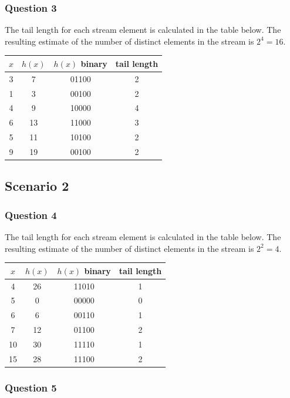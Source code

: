 \documentclass[12t]{article}
\begin{document}
	\subsubsection*{Question 3}
	
	The tail length for each stream element is calculated in the table below. The resulting estimate of the number of distinct elements in the stream is $2^{4}=16$.\\

	\begin{tabular}{cccc}
	$x$ & $h(x)$ & $h(x)$ binary & tail length \\
	\hline
	3 & 7 & 01100 & 2 \\
	1 & 3 & 00100 & 2 \\
	4 & 9 & 10000 & 4 \\
	6 & 13 & 11000 & 3 \\
	5 & 11 & 10100 & 2 \\
	9 & 19 & 00100 & 2 \\
	\hline
	\end{tabular}
	
	\subsection*{Scenario 2}	
	
	\subsubsection*{Question 4}
	
	The tail length for each stream element is calculated in the table below. The resulting estimate of the number of distinct elements in the stream is $2^{2}=4$. \\
	
	\begin{tabular}{cccc}
	$x$ & $h(x)$ & $h(x)$ binary & tail length \\
	\hline
	4 & 26 & 11010 & 1 \\
	5 & 0 & 00000 & 0 \\
	6 & 6 & 00110 & 1 \\
	7 & 12 & 01100 & 2 \\
	10 & 30 & 11110 & 1 \\
	15 & 28 & 11100 & 2 \\
	\hline
	\end{tabular}
	
	\subsubsection*{Question 5}
	
\end{document}
